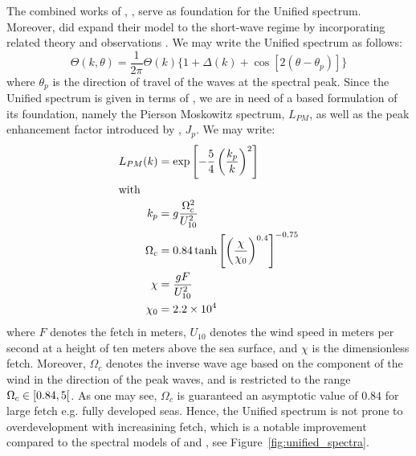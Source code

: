The combined works of \citet{article:Hasselman1973}, \citet{article:Mitsuyasu1975},
\citet{article:Donelan1985} serve as foundation for the Unified spectrum. 
Moreover, \citeauthor{article:Elfouhaily1997} did expand their model to the
short-wave regime by incorporating related theory \citep{book:Kitaigorodskii1970,
article:Phillips1985} and observations \citep{article:CoxMunk1954,article:Jaehne1990a,
article:Hara1994}. We may write the Unified spectrum as follows:
%
\begin{equation}
 \Theta(k, \theta) = \frac{1}{2\pi}\Theta(k)\{1 + \Delta(k) + \cos[2(\theta - \theta_p)]\}
\end{equation}
%
where $\theta_p$ is the direction of travel of the waves at the spectral peak. 
Since the Unified spectrum is given in terms of \wavenumber, we are in need of a 
\wavenumber based formulation of its foundation, namely the Pierson Moskowitz 
spectrum, $L_{PM}$, as well as the peak enhancement factor introduced by 
\citeauthor{article:Hasselman1973}, $J_p$. We may write:
%
\begin{subequations}
\begin{align}
L_{PM}(k) &= \exp\left[-\frac{5}{4} \left(\frac{k_p}{k}\right)^2 \right] \\
\intertext{with}
k_p &= g\frac{\Omega_c^2}{U_{10}^2} \\
\Omega_c &= 0.84 \tanh\left[\left(\frac{\chi}{\chi_0}\right)^{0.4}\right]^{-0.75} \\
\chi &= \frac{gF}{U_{10}^{2}} \\
\chi_0 &= 2.2 \times 10^4
\end{align}
\end{subequations}
%
where $F$ denotes the fetch in meters, $U_{10}$ denotes the wind speed in 
meters per second at a height of ten meters above the sea surface, and $\chi$ 
is the dimensionless fetch.
Moreover, $\Omega_c$ denotes the inverse wave age based on the 
component of the wind in the direction of the peak waves,
and is restricted to 
the range $\Omega_c \in \interval[open right]{0.84}{5}$. As one may see, 
$\Omega_c$ is guaranteed an asymptotic value of $0.84$ for large fetch e.g. 
fully developed seas. Hence, the Unified spectrum is not prone to 
overdevelopment with increasining fetch, which is a notable improvement 
compared to the spectral models of \citeauthor{article:Hasselman1973}
and \citeauthor{article:Donelan1985}, see Figure~\ref{fig:unified_spectra}.
